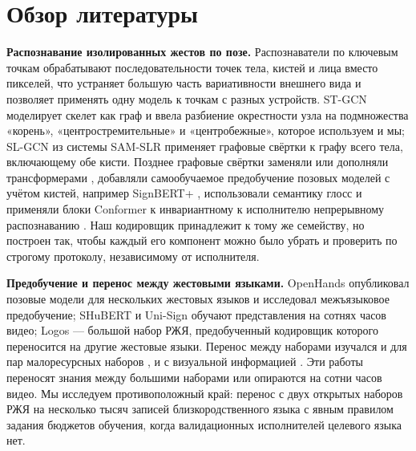 \hypertarget{ux43eux431ux437ux43eux440-ux43bux438ux442ux435ux440ux430ux442ux443ux440ux44b}{%
\section{Обзор литературы}\label{ux43eux431ux437ux43eux440-ux43bux438ux442ux435ux440ux430ux442ux443ux440ux44b}}

\textbf{Распознавание изолированных жестов по позе.} Распознаватели по ключевым точкам обрабатывают последовательности точек тела, кистей и лица вместо пикселей, что устраняет большую часть вариативности внешнего вида и позволяет применять одну модель к точкам с разных устройств. ST-GCN \citep{2018_yan_stgcn} моделирует скелет как граф и ввела разбиение окрестности узла на подмножества «корень», «центростремительные» и «центробежные», которое используем и мы; SL-GCN из системы SAM-SLR \citep{2021_jiang_sam_slr} применяет графовые свёртки к графу всего тела, включающему обе кисти. Позднее графовые свёртки заменяли или дополняли трансформерами \citep{2017_vaswani_attention}, добавляли самообучаемое предобучение позовых моделей с учётом кистей, например SignBERT+ \citep{2023_hu_signbert_plus}, использовали семантику глосс \citep{2023_zuo_nla_slr} и применяли блоки Conformer \citep{2020_gulati_conformer} к инвариантному к исполнителю непрерывному распознаванию \citep{2025_isharah_signer_invariant_conformer}. Наш кодировщик принадлежит к тому же семейству, но построен так, чтобы каждый его компонент можно было убрать и проверить по строгому протоколу, независимому от исполнителя.

\textbf{Предобучение и перенос между жестовыми языками.} OpenHands \citep{2022_selvaraj_openhands} опубликовал позовые модели для нескольких жестовых языков и исследовал межъязыковое предобучение; SHuBERT \citep{2025_gueuwou_shubert} и Uni-Sign \citep{2025_li_uni_sign} обучают представления на сотнях часов видео; Logos \citep{2025_ovodov_logos} --- большой набор РЖЯ, предобученный кодировщик которого переносится на другие жестовые языки. Перенос между наборами изучался и для пар малоресурсных наборов \citep{2024_kindiroglu_cross_dataset_transfer}, и с визуальной информацией \citep{2023_ryumin_cross_language_transfer}. Эти работы переносят знания между большими наборами или опираются на сотни часов видео. Мы исследуем противоположный край: перенос с двух открытых наборов РЖЯ на несколько тысяч записей близкородственного языка с явным правилом задания бюджетов обучения, когда валидационных исполнителей целевого языка нет.

